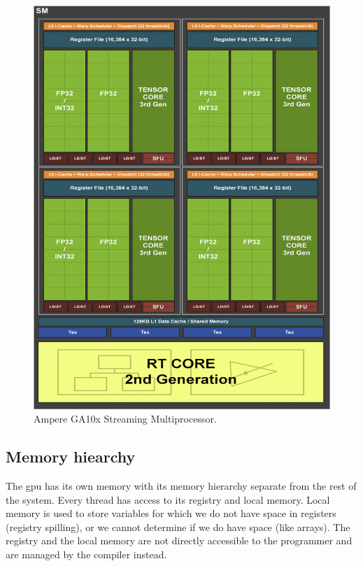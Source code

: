 \begin{figure}[H]
  \centering
  \includegraphics[width=\textwidth]{components/figure/ampere-sm.png}
  \caption{Ampere GA10x Streaming Multiprocessor. \cite{nvidiaampere}}
  \label{figure:ampere-sm}
\end{figure}

\subsection{Memory hiearchy} \label{label:gpu:mem}

The \acrshort{gpu} has its own memory with its memory hierarchy separate from the rest of the system. Every thread has access to its registry and local memory. Local memory is used to store variables for which we do not have space in registers (registry spilling), or we cannot determine if we do have space (like arrays). The registry and the local memory are not directly accessible to the programmer and are managed by the compiler instead.

